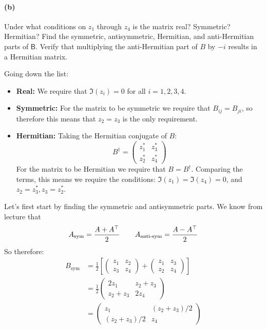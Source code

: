 \documentclass{article}
\begin{document}
\paragraph{(b)}
Under what conditions on $z_{1}$ through $z_{4}$ is the matrix real?  Symmetric?  Hermitian?
Find the symmetric, antisymmetric, Hermitian, and anti-Hermitian parts of $\mathsf{B}$.  Verify that multiplying the anti-Hermitian part of $B$ by $-i$ results in a Hermitian matrix.


\begin{solution}
	Going down the list: 
	\begin{itemize}
		\item \textbf{Real:} We require that $\Im(z_i) = 0$ for all $i = 1, 2, 3, 4$.
		\item \textbf{Symmetric:} For the matrix to be symmetric we require that $B_{ij} = B_{ji}$, so therefore
			this means that $z_2 = z_3$ is the only requirement.
		\item \textbf{Hermitian:} Taking the Hermitian conjugate of $B$:
			\[
				B^\dagger = \begin{pmatrix} z_1^* & z_3^*\\ z_2^* & z_4^* \end{pmatrix} 
			\] 
			For the matrix to be Hermitian we require that $B = B^\dagger$. Comparing the terms, this means we 
			require the conditions: $\Im(z_1) = \Im(z_4) = 0$, and $z_2 = z_3^*, z_3 = z_2^*$.
	\end{itemize}
	Let's first start by finding the symmetric and antisymmetric parts. We know from lecture that 
	\[
		A_{\text{sym}} = \frac{A + A^\top}{2} \phantom{aaaa} A_{\text{anti-sym}} = \frac{A - A^\top}{2}
	\] 
	So therefore:
	\begin{align*}
		B_{\text{sym}} &= \frac{1}{2}\left[ \begin{pmatrix} z_1 & z_2\\ z_3 & z_4 \end{pmatrix} + \begin{pmatrix} z_1 & z_3 \\ z_2 & z_4 \end{pmatrix}\right] \\
					   &= \frac{1}{2}\begin{pmatrix} 2z_1 & z_2 + z_3\\ z_2 + z_3 & 2z_4\end{pmatrix} \\
					   &= \begin{pmatrix} z_1 & (z_2 + z_3)/2\\ (z_2 + z_3) / 2 & z_4 \end{pmatrix} 

\end{align*}
\end{solution}
\end{document}
